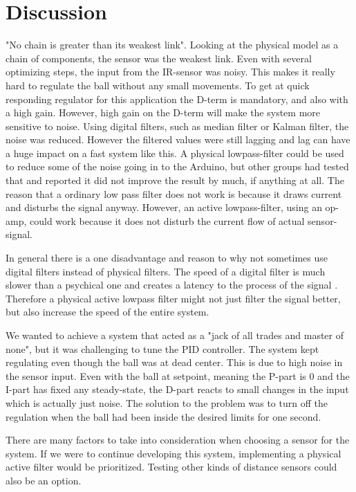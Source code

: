 \section{Discussion}
"No chain is greater than its weakest link". Looking at the physical model as a chain of components, the sensor was the weakest link. Even with several optimizing steps, the input from the IR-sensor was noisy. This makes it really hard to regulate the ball without any small movements. To get at quick responding regulator for this application the D-term is mandatory, and also with a high gain. However, high gain on the D-term will make the system more sensitive to noise. Using digital filters, such as median filter or Kalman filter, the noise was reduced. However the filtered values were still lagging and lag can have a huge impact on a fast system like this.
A physical lowpass-filter could be used to reduce some of the noise going in to the Arduino, but other groups had tested that and reported it did not improve the result by much, if anything at all. The reason that a ordinary low pass filter does not work is because it draws current and disturbs the signal anyway. However, an active lowpass-filter, using an op-amp, could work because it does not disturb the current flow of actual sensor-signal.

In general there is a one disadvantage and reason to why not sometimes use digital filters instead of physical filters. The speed of a digital filter is much slower than a psychical one and creates a latency to the process of the signal \cite{digital-filter}. Therefore a physical active lowpass filter might not just filter the signal better, but also increase the speed of the entire system. 

We wanted to achieve a system that acted as a "jack of all trades and master of none", but it was challenging to tune the PID controller. The system kept regulating even though the ball 
was at dead center. This is due to high noise in the sensor input. Even with the ball at setpoint, meaning the P-part is 0 and the I-part has fixed any steady-state, the D-part reacts to small changes in the input which is actually just noise. The solution to the problem was to turn off the regulation when the ball had been inside the desired limits for one second.

There are many factors to take into consideration when choosing a sensor for the system. If we were to continue developing this system, implementing a physical active filter would be prioritized. Testing other kinds of distance sensors could also be an option.